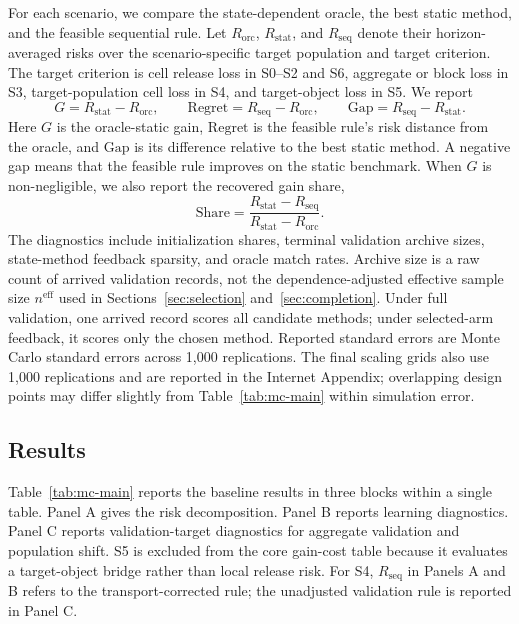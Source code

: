 \documentclass[a4paper, 12pt]{article}
\theoremstyle{plain}
\theoremstyle{remark}
\newcommand{\1}{\mathbf{1}}
\begin{document}
For each scenario, we compare the state-dependent oracle, the best static method, and the feasible sequential rule. Let \(R_{\mathrm{orc}}\), \(R_{\mathrm{stat}}\), and \(R_{\mathrm{seq}}\) denote their horizon-averaged risks over the scenario-specific target population and target criterion. The target criterion is cell release loss in S0--S2 and S6, aggregate or block loss in S3, target-population cell loss in S4, and target-object loss in S5. We report
\[
G = R_{\mathrm{stat}} - R_{\mathrm{orc}},\qquad
\mathrm{Regret} = R_{\mathrm{seq}} - R_{\mathrm{orc}},\qquad
\mathrm{Gap} = R_{\mathrm{seq}} - R_{\mathrm{stat}} .
\]
Here \(G\) is the oracle-static gain, \(\mathrm{Regret}\) is the feasible rule's risk distance from the oracle, and \(\mathrm{Gap}\) is its difference relative to the best static method. A negative gap means that the feasible rule improves on the static benchmark. When \(G\) is non-negligible, we also report the recovered gain share,
\[
\mathrm{Share}=\frac{R_{\mathrm{stat}}-R_{\mathrm{seq}}}{R_{\mathrm{stat}}-R_{\mathrm{orc}}}.
\]
The diagnostics include initialization shares, terminal validation archive sizes, state-method feedback sparsity, and oracle match rates. Archive size is a raw count of arrived validation records, not the dependence-adjusted effective sample size \(n^{\mathrm{eff}}\) used in Sections~\ref{sec:selection} and~\ref{sec:completion}. Under full validation, one arrived record scores all candidate methods; under selected-arm feedback, it scores only the chosen method. Reported standard errors are Monte Carlo standard errors across 1,000 replications. The final scaling grids also use 1,000 replications and are reported in the Internet Appendix; overlapping design points may differ slightly from Table~\ref{tab:mc-main} within simulation error.

\subsection{Results}
\label{subsec:mc-results}

Table~\ref{tab:mc-main} reports the baseline results in three blocks within a single table. Panel A gives the risk decomposition. Panel B reports learning diagnostics. Panel C reports validation-target diagnostics for aggregate validation and population shift. S5 is excluded from the core gain-cost table because it evaluates a target-object bridge rather than local release risk. For S4, \(R_{\mathrm{seq}}\) in Panels A and B refers to the transport-corrected rule; the unadjusted validation rule is reported in Panel C.
\end{document}
